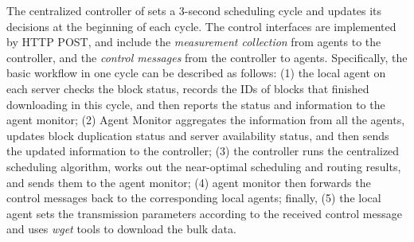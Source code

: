 The centralized controller of \name sets a 3-second scheduling cycle and updates its decisions at the beginning of each cycle. The control interfaces are implemented by HTTP POST, and include the {\em measurement collection} from agents to the controller, and the {\em control messages} from the controller to agents. Specifically, the basic workflow in one cycle can be described as follows: (1) the local agent on each server checks the block status, records the IDs of blocks that finished downloading in this cycle, and then reports the status and information to the agent monitor; (2) Agent Monitor aggregates the information from all the agents, updates block duplication status and server availability status, and then sends the updated information to the controller; (3) the controller runs the centralized scheduling algorithm, works out the near-optimal scheduling and routing results, and sends them to the agent monitor; (4) agent monitor then forwards the control messages back to the corresponding local agents; finally, (5) the local agent sets the transmission parameters according to the received control message and uses \emph{wget} tools to download the bulk data.

